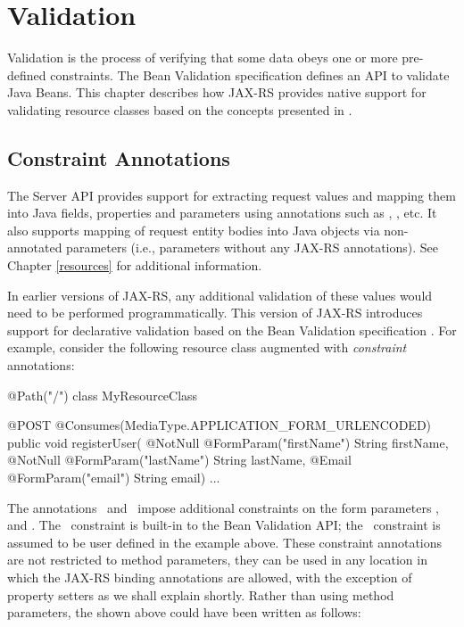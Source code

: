 \chapter{Validation}
\label{validation}

Validation is the process of verifying that some data obeys one or more pre-defined constraints. The Bean Validation specification \cite{bv11} defines an API to validate Java Beans. This chapter describes how JAX-RS provides native support for validating resource classes based on the concepts presented in \cite{bv11}.

\section{Constraint Annotations}
\label{constraint_annotations}

The Server API provides support for extracting request values and mapping them into Java fields, properties and parameters using annotations such as , , etc. It also supports mapping of request entity bodies into Java objects via non-annotated parameters (i.e., parameters without any JAX-RS annotations). See Chapter \ref{resources} for additional information.

In earlier versions of JAX-RS, any additional validation of these values would need to be performed programmatically. This version of JAX-RS introduces support for declarative validation based on the Bean Validation specification \cite{bv11}. For example, consider the following resource class augmented with \emph{constraint} annotations:

\begin{listing}{1}
@Path("/")
class MyResourceClass {

    @POST
    @Consumes(MediaType.APPLICATION_FORM_URLENCODED)
    public void registerUser(
        @NotNull @FormParam("firstName") String firstName,
        @NotNull @FormParam("lastName") String lastName,
        @Email @FormParam("email") String email) {
        ...
    }
}
\end{listing}

The annotations \NotNull\ and \Email\ impose additional constraints on the form parameters ,  and . The \NotNull\ constraint is built-in to the Bean Validation API; the \Email\ constraint is assumed to be user defined in the example above. These constraint annotations are not restricted to method parameters, they can be used in any location in which the JAX-RS binding annotations are allowed, with the exception of property setters as we shall explain shortly. Rather than using method parameters, the  shown above could have been written as follows:


